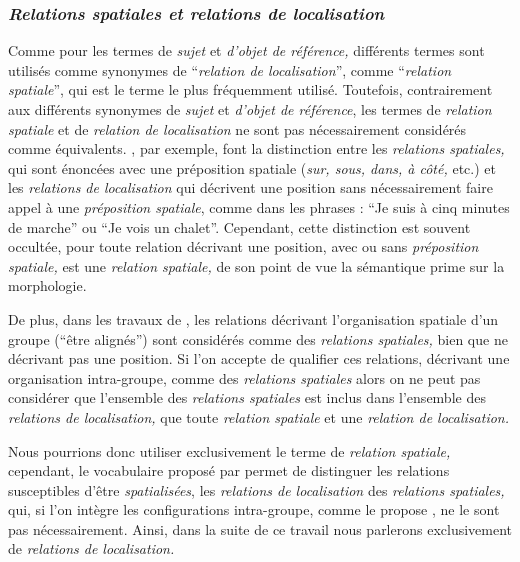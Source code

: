 
\subsubsection{\emph{Relations spatiales et relations de localisation}}

Comme pour les termes de \emph{sujet} et \emph{d'objet de référence,}
différents termes sont utilisés comme synonymes de
\enquote{\emph{relation de localisation}}, comme
\enquote{\emph{relation spatiale}}, qui est le terme le plus
fréquemment utilisé. Toutefois, contrairement aux différents synonymes
de \emph{sujet} et \emph{d'objet de référence}, les termes de
\emph{relation spatiale} et de \emph{relation de localisation} ne sont
pas nécessairement considérés comme
équivalents. \textcite{Duchene2019}, par exemple, font la distinction
entre les \emph{relations spatiales,} qui sont énoncées avec une
préposition spatiale (\eg \emph{sur, sous, dans, à côté,} etc.) et les
\emph{relations de localisation} qui décrivent une position sans
nécessairement faire appel à une \emph{préposition spatiale}, comme
dans les phrases : \enquote{Je suis à cinq minutes de marche} ou
\enquote{Je vois un chalet}. Cependant, cette distinction est souvent
occultée, pour \textcite{Vandeloise1986} toute relation décrivant une
position, avec ou sans \emph{préposition spatiale,} est une
\emph{relation spatiale,} de son point de vue la sémantique prime sur
la morphologie.

De plus, dans les travaux de \textcite{Bateman2010}, les relations
décrivant l'organisation spatiale d'un groupe (\eg \enquote{être
  alignés}) sont considérés comme des \emph{relations spatiales,} bien
que ne décrivant pas une position. Si l'on accepte de qualifier ces
relations, décrivant une organisation intra-groupe, comme des
\emph{relations spatiales} alors on ne peut pas considérer que
l'ensemble des \emph{relations spatiales} est inclus dans l'ensemble
des \emph{relations de localisation,} \ie que toute \emph{relation
  spatiale} et une \emph{relation de localisation.}

Nous pourrions donc utiliser exclusivement le terme de \emph{relation
  spatiale,} cependant, le vocabulaire proposé par
\textcite{Duchene2019} permet de distinguer les relations susceptibles
d'être \emph{spatialisées}, \ie les \emph{relations de localisation}
des \emph{relations spatiales,} qui, si l'on intègre les
configurations intra-groupe, comme le propose \textcite{Bateman2010},
ne le sont pas nécessairement. Ainsi, dans la suite de ce travail nous
parlerons exclusivement de \emph{relations de localisation.}

